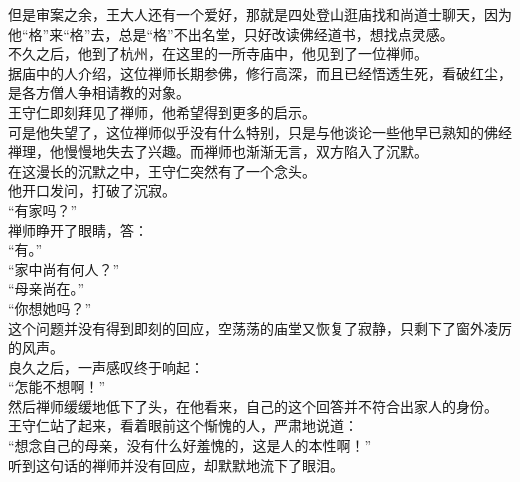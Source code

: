 \begin{multicols}{\theparacolNo}
但是审案之余，王大人还有一个爱好，那就是四处登山逛庙找和尚道士聊天，因为他“格”来“格”去，总是“格”不出名堂，只好改读佛经道书，想找点灵感。\\

不久之后，他到了杭州，在这里的一所寺庙中，他见到了一位禅师。\\

据庙中的人介绍，这位禅师长期参佛，修行高深，而且已经悟透生死，看破红尘，是各方僧人争相请教的对象。\\

王守仁即刻拜见了禅师，他希望得到更多的启示。\\

可是他失望了，这位禅师似乎没有什么特别，只是与他谈论一些他早已熟知的佛经禅理，他慢慢地失去了兴趣。而禅师也渐渐无言，双方陷入了沉默。\\

在这漫长的沉默之中，王守仁突然有了一个念头。\\

他开口发问，打破了沉寂。\\

“有家吗？”\\

禅师睁开了眼睛，答：\\

“有。”\\

“家中尚有何人？”\\

“母亲尚在。”\\

“你想她吗？”\\

这个问题并没有得到即刻的回应，空荡荡的庙堂又恢复了寂静，只剩下了窗外凌厉的风声。\\

良久之后，一声感叹终于响起：\\

“怎能不想啊！”\\

然后禅师缓缓地低下了头，在他看来，自己的这个回答并不符合出家人的身份。\\

王守仁站了起来，看着眼前这个惭愧的人，严肃地说道：\\

“想念自己的母亲，没有什么好羞愧的，这是人的本性啊！”\\

听到这句话的禅师并没有回应，却默默地流下了眼泪。\\


\end{multicols}
